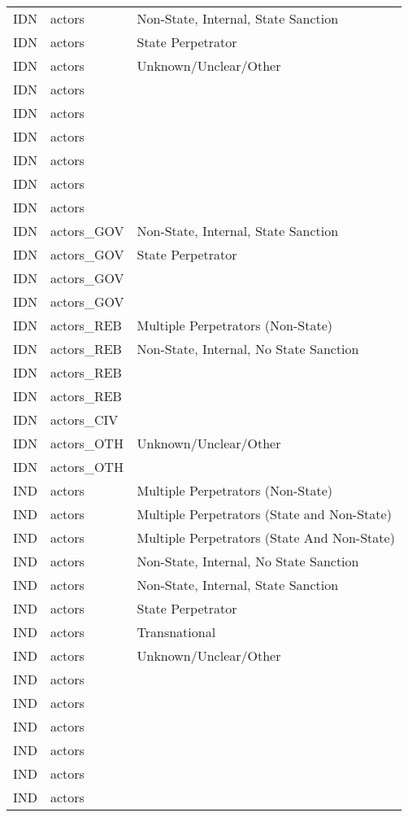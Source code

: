 \begin{table}[ht]
\begin{tabular}{lll}
  IDN & actors & Non-State, Internal, State Sanction \\ 
  IDN & actors & State Perpetrator \\ 
  IDN & actors & Unknown/Unclear/Other \\ 
  IDN & actors &  \\ 
  IDN & actors &  \\ 
  IDN & actors &  \\ 
  IDN & actors &  \\ 
  IDN & actors &  \\ 
  IDN & actors &  \\ 
  IDN & actors\_GOV & Non-State, Internal, State Sanction \\ 
  IDN & actors\_GOV & State Perpetrator \\ 
  IDN & actors\_GOV &  \\ 
  IDN & actors\_GOV &  \\ 
  IDN & actors\_REB & Multiple Perpetrators (Non-State) \\ 
  IDN & actors\_REB & Non-State, Internal, No State Sanction \\ 
  IDN & actors\_REB &  \\ 
  IDN & actors\_REB &  \\ 
  IDN & actors\_CIV &  \\ 
  IDN & actors\_OTH & Unknown/Unclear/Other \\ 
  IDN & actors\_OTH &  \\ 
  IND & actors & Multiple Perpetrators (Non-State) \\ 
  IND & actors & Multiple Perpetrators (State and Non-State) \\ 
  IND & actors & Multiple Perpetrators (State And Non-State) \\ 
  IND & actors & Non-State, Internal, No State Sanction \\ 
  IND & actors & Non-State, Internal, State Sanction \\ 
  IND & actors & State Perpetrator \\ 
  IND & actors & Transnational \\ 
  IND & actors & Unknown/Unclear/Other \\ 
  IND & actors &  \\ 
  IND & actors &  \\ 
  IND & actors &  \\ 
  IND & actors &  \\ 
  IND & actors &  \\ 
  IND & actors &  \\ 

\end{tabular}
\end{table}
